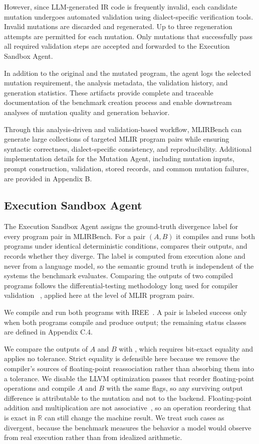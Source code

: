 \documentclass[sigplan,screen,review,anonymous]{acmart}
\begin{document}
However, since LLM-generated IR code is frequently invalid, each candidate mutation undergoes automated validation using dialect-specific verification tools. Invalid mutations are discarded and regenerated. Up to three regeneration attempts are permitted for each mutation. Only mutations that successfully pass all required validation steps are accepted and forwarded to the Execution Sandbox Agent.

In addition to the original and the mutated program, the agent logs the selected mutation requirement, the analysis metadata, the validation history, and generation statistics. These artifacts provide complete and traceable documentation of the benchmark creation process and enable downstream analyses of mutation quality and generation behavior.

Through this analysis-driven and validation-based workflow, MLIRBench can generate large collections of targeted MLIR program pairs while ensuring syntactic correctness, dialect-specific consistency, and reproducibility. Additional implementation details for the Mutation Agent, including mutation inputs, prompt construction, validation, stored records, and common mutation failures, are provided in Appendix B.

\subsection{Execution Sandbox Agent}
\label{sec:execution_agent}

The Execution Sandbox Agent assigns the ground-truth divergence label for every
program pair in MLIRBench. For a pair $(A,B)$ it compiles and runs both programs
under identical deterministic conditions, compares their outputs, and records
whether they diverge. The label is computed from execution alone and never from
a language model, so the semantic ground truth is independent of the systems the
benchmark evaluates. Comparing the outputs of two compiled programs follows the
differential-testing methodology long used for compiler validation%
~\cite{yang2011csmith,le2014emi}, %
applied here at the level of MLIR program pairs.

We compile and run both programs with IREE~\cite{iree2023}. A pair is labeled success only when both programs compile and produce output; the remaining status classes are defined in Appendix C.4.

We compare the outputs of $A$ and $B$ with , which
requires bit-exact equality and applies no tolerance. Strict equality is
defensible here because we remove the compiler's sources of floating-point
reassociation rather than absorbing them into a tolerance. We disable the LLVM
optimization passes that reorder floating-point operations and compile $A$ and $B$ with the same flags,
so any surviving output difference is attributable to the mutation and not to the
backend. Floating-point addition and multiplication are not
associative~\cite{goldberg1991floating}, so an operation reordering that is exact
in $\mathbb{R}$ can still change the machine result. We treat such cases as
divergent, because the benchmark measures the behavior a model would observe from
real execution rather than from idealized arithmetic.
\end{document}

